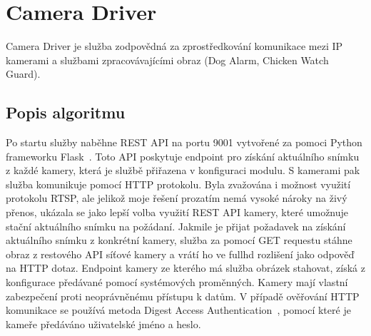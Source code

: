 \section{Camera Driver}\label{sec:camera-driver}
Camera Driver je služba zodpovědná za zprostředkování komunikace mezi IP kamerami a službami zpracovávajícími obraz (Dog Alarm, Chicken Watch Guard).\newline

\subsection*{Popis algoritmu}
Po startu služby naběhne REST API na portu 9001 vytvořené za pomoci Python frameworku Flask~\cite{FlaskFramework}.
Toto API poskytuje endpoint pro získání aktuálního snímku z každé kamery, která je službě přiřazena v konfiguraci modulu.
S kamerami pak služba komunikuje pomocí HTTP protokolu.
Byla zvažována i možnost využití protokolu RTSP, ale jelikož moje řešení prozatím nemá vysoké nároky na živý přenos, ukázala se jako lepší volba využití REST API kamery, které umožnuje stační aktuálního snímku na požádaní.
Jakmile je přijat požadavek na získání aktuálního snímku z konkrétní kamery, služba za pomocí GET requestu stáhne obraz z restového API síťové kamery a vrátí ho ve \gls{fullhd} rozlišení jako odpověď na HTTP dotaz.
Endpoint kamery ze kterého má služba obrázek stahovat, získá z konfigurace předávané pomocí systémových proměnných.
Kamery mají vlastní zabezpečení proti neoprávněnému přístupu k datům.
V případě ověřování HTTP komunikace se používá metoda Digest Access Authentication~\cite{digestAccessAuth}, pomocí které je kameře předáváno uživatelské jméno a heslo.


%
%
%
%
